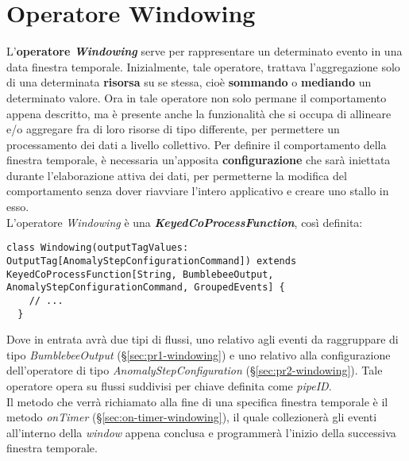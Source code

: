 \section{Operatore Windowing}
L'\textbf{operatore \textit{Windowing}} serve per rappresentare un determinato evento in una data finestra temporale. Inizialmente, tale operatore, trattava l'aggregazione solo di una determinata \textbf{risorsa} su se stessa, cioè \textbf{sommando} o \textbf{mediando} un determinato valore. Ora in tale operatore non solo permane il comportamento appena descritto, ma è presente anche la funzionalità che si occupa di allineare e/o aggregare fra di loro risorse di tipo differente, per permettere un processamento dei dati a livello collettivo. Per definire il comportamento della finestra temporale, è necessaria un'apposita \textbf{configurazione} che sarà iniettata durante l'elaborazione attiva dei dati, per permetterne la modifica del comportamento senza dover riavviare l'intero applicativo e creare uno stallo in esso.\\
L'operatore \textit{Windowing} è una \textbf{\textit{KeyedCoProcessFunction}}, così definita:
\begin{verbatim}
class Windowing(outputTagValues: OutputTag[AnomalyStepConfigurationCommand]) extends KeyedCoProcessFunction[String, BumblebeeOutput, AnomalyStepConfigurationCommand, GroupedEvents] {
	// ...
  }
\end{verbatim}
Dove in entrata avrà due tipi di flussi, uno relativo agli eventi da raggruppare di tipo \textit{BumblebeeOutput} (\S\ref{sec:pr1-windowing}) e uno relativo alla configurazione dell'operatore di tipo \textit{AnomalyStepConfiguration} (\S\ref{sec:pr2-windowing}). Tale operatore opera su flussi suddivisi per chiave definita come \textit{pipeID}.\\
Il metodo che verrà richiamato alla fine di una specifica finestra temporale è il metodo \textit{onTimer} (\S\ref{sec:on-timer-windowing}), il quale collezionerà gli eventi all'interno della \textit{window} appena conclusa e programmerà l'inizio della successiva finestra temporale.

